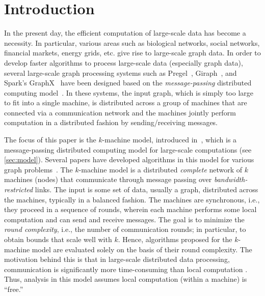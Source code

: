 \section{Introduction}\label{sec:intro}

In the present day, the efficient computation of large-scale data has become a necessity. 
In particular, various areas such as biological networks, social networks,
financial markets, energy grids, etc. give rise to large-scale graph data. In
order to develop faster algorithms to process large-scale data (especially graph
data), several large-scale graph processing systems such as Pregel~\cite{pregel},
Giraph~\cite{Giraph}, and Spark's GraphX~\cite{graphx} have been designed based
on the \emph{message-passing} distributed computing model~\cite{Lynch96,Peleg00}.
In these systems, the input graph, which is simply too large to fit into a single
machine, is distributed across a group of machines that are connected via a
communication network and the machines jointly perform computation in a
distributed fashion by sending/receiving messages.

The focus of this paper is the \(k\)-machine model, introduced
in~\cite{KlauckNPR15}, which  is a message-passing distributed computing model
for large-scale computations (see \cref{sec:model}). Several papers have
developed algorithms in this model for various graph problems~\cite{KlauckNPR15,topc18,BandyapadhyayIPP18,PRS21,pemmaraju-opodis18,peter,gilbert,ipdps21}.
The \(k\)-machine model is a distributed \emph{complete} network of \(k\)
machines (nodes) that communicate through message passing over
\emph{bandwidth-restricted} links. The input is some set of data, usually a
graph, distributed across the machines, typically in a balanced fashion. The
machines are synchronous, i.e., they proceed in a sequence of rounds, wherein
each machine performs some local computation and can send and receive messages.
The goal is to minimize the \emph{round complexity}, i.e., the number of
communication rounds; in particular, to obtain bounds that scale well with $k$.
Hence, algorithms proposed for the \(k\)-machine model are evaluated solely on
the basis of their round complexity. The motivation behind this is that in
large-scale distributed data processing, communication is significantly more
time-consuming than local computation \cite{KlauckNPR15,topc18,cacm}.
Thus, analysis in this model assumes local computation (within a machine)
is  ``free.''

